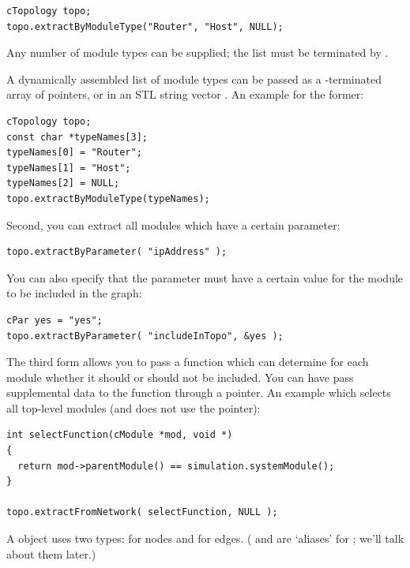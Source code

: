 \begin{verbatim}
cTopology topo;
topo.extractByModuleType("Router", "Host", NULL);
\end{verbatim}

Any number of module types can be supplied; the list must be terminated by .

A dynamically assembled list of module types can be passed as a
-terminated array of  pointers, or
in an STL string vector .
An example for the former:

\begin{verbatim}
cTopology topo;
const char *typeNames[3];
typeNames[0] = "Router";
typeNames[1] = "Host";
typeNames[2] = NULL;
topo.extractByModuleType(typeNames);
\end{verbatim}

Second, you can extract all modules which have a certain parameter:

\begin{verbatim}
topo.extractByParameter( "ipAddress" );
\end{verbatim}

You can also specify that the parameter must have a certain value
for the module to be included in the graph:

\begin{verbatim}
cPar yes = "yes";
topo.extractByParameter( "includeInTopo", &yes );
\end{verbatim}

The third form allows you to pass a function which can determine for
each module whether it should or should not be included.  You can have
 pass supplemental data to the function through a
 pointer. An example which selects all top-level modules (and
does not use the  pointer):

\begin{verbatim}
int selectFunction(cModule *mod, void *)
{
  return mod->parentModule() == simulation.systemModule();
}

topo.extractFromNetwork( selectFunction, NULL );
\end{verbatim}

%
%

A  object uses two types:  for
nodes and  for edges. ( and
 are `aliases' for ; we'll
talk about them later.)


